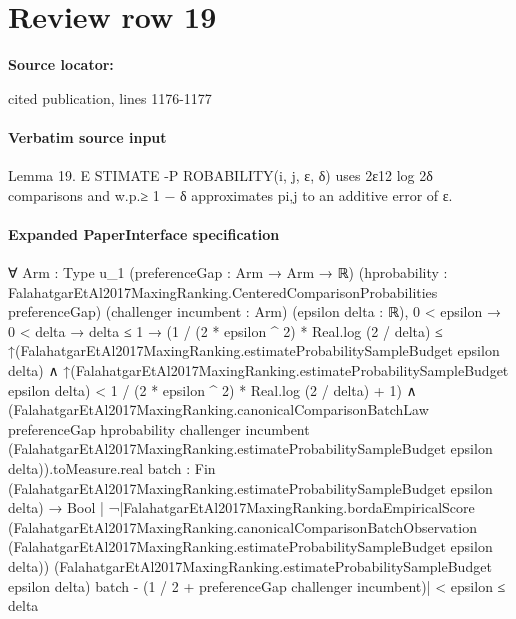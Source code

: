 \documentclass[10pt]{article}
\begin{document}
\section*{Review row 19}
\textbf{Source locator:} {\footnotesize\raggedright cited publication, lines 1176-\allowbreak{}1177\par}
\paragraph{Verbatim source input}
\begin{ReviewVerbatim}
Lemma 19. E STIMATE -P ROBABILITY(i, j, ε, δ) uses 2ε12 log 2δ comparisons and w.p.≥ 1 − δ approximates
pi,j to an additive error of ε.
\end{ReviewVerbatim}



\paragraph{Expanded PaperInterface specification}
\begin{ReviewVerbatim}
∀ {Arm : Type u_1} (preferenceGap : Arm → Arm → ℝ)
  (hprobability : FalahatgarEtAl2017MaxingRanking.CenteredComparisonProbabilities preferenceGap)
  (challenger incumbent : Arm) (epsilon delta : ℝ),
  0 < epsilon →
    0 < delta →
      delta ≤ 1 →
        (1 / (2 * epsilon ^ 2) * Real.log (2 / delta) ≤
              ↑(FalahatgarEtAl2017MaxingRanking.estimateProbabilitySampleBudget epsilon delta) ∧
            ↑(FalahatgarEtAl2017MaxingRanking.estimateProbabilitySampleBudget epsilon delta) <
              1 / (2 * epsilon ^ 2) * Real.log (2 / delta) + 1) ∧
          (FalahatgarEtAl2017MaxingRanking.canonicalComparisonBatchLaw preferenceGap hprobability challenger incumbent
                    (FalahatgarEtAl2017MaxingRanking.estimateProbabilitySampleBudget epsilon delta)).toMeasure.real
              {batch : Fin (FalahatgarEtAl2017MaxingRanking.estimateProbabilitySampleBudget epsilon delta) → Bool |
                ¬|FalahatgarEtAl2017MaxingRanking.bordaEmpiricalScore
                          (FalahatgarEtAl2017MaxingRanking.canonicalComparisonBatchObservation
                            (FalahatgarEtAl2017MaxingRanking.estimateProbabilitySampleBudget epsilon delta))
                          (FalahatgarEtAl2017MaxingRanking.estimateProbabilitySampleBudget epsilon delta) batch -
                        (1 / 2 + preferenceGap challenger incumbent)| <
                    epsilon} ≤
            delta
\end{ReviewVerbatim}
\end{document}

